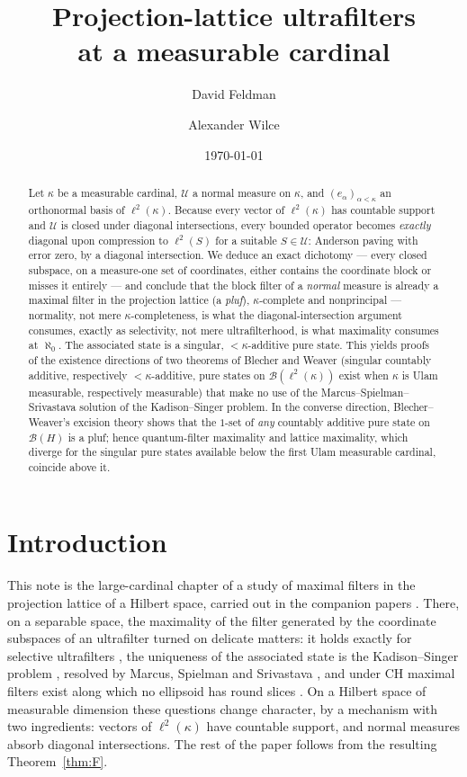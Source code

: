 \documentclass[11pt,reqno]{amsart}
\title[Projection-lattice ultrafilters at a measurable cardinal]
{Projection-lattice ultrafilters\\ at a measurable cardinal}
\author{David Feldman}
\author{Alexander Wilce}
\date{\today}
\theoremstyle{definition}
\newcommand{\U}{\mathcal{U}}
\newcommand{\lk}{\ell^2(\kappa)}
\newcommand{\Blk}{\mathcal{B}(\ell^2(\kappa))}
\begin{document}
\begin{abstract}
Let $\kappa$ be a measurable cardinal, $\U$ a normal measure on $\kappa$, and
$(e_\alpha)_{\alpha<\kappa}$ an orthonormal basis of $\lk$. Because every vector of
$\lk$ has countable support and $\U$ is closed under diagonal intersections, every
bounded operator becomes \emph{exactly} diagonal upon compression to $\ell^2(S)$ for a
suitable $S\in\U$: Anderson paving with error zero, by a diagonal intersection. We
deduce an exact dichotomy --- every closed subspace, on a measure-one set of
coordinates, either contains the coordinate block or misses it entirely --- and
conclude that the block filter of a \emph{normal} measure is already a maximal filter
in the projection lattice (a \emph{pluf}), $\kappa$-complete and nonprincipal ---
normality, not mere $\kappa$-completeness, is what the diagonal-intersection argument
consumes, exactly as selectivity, not mere ultrafilterhood, is what maximality
consumes at $\aleph_0$. The associated state is
a singular, $<\kappa$-additive pure state. This yields proofs of the existence
directions of two theorems of Blecher and Weaver (singular countably additive,
respectively $<\kappa$-additive, pure states on $\Blk$ exist when $\kappa$ is Ulam
measurable, respectively measurable) that make no use of the Marcus--Spielman--Srivastava
solution of the Kadison--Singer problem. In the converse direction, Blecher--Weaver's
excision theory shows that the $1$-set of \emph{any} countably additive pure state on
$\mathcal B(H)$ is a pluf; hence quantum-filter maximality and lattice maximality, which
diverge for the singular pure states available below the first Ulam measurable cardinal,
coincide above it.
\end{abstract}

\maketitle

\section{Introduction}\label{sec:intro}

This note is the large-cardinal chapter of a study of maximal filters in the projection
lattice of a Hilbert space, carried out in the companion papers \cite{FWI,FWII}. There,
on a separable space, the maximality of the filter generated by the coordinate
subspaces of an ultrafilter turned on delicate matters: it holds exactly for selective
ultrafilters \cite{FWII}, the uniqueness of the associated state is the Kadison--Singer
problem \cite{KadisonSinger}, resolved by Marcus, Spielman and Srivastava \cite{MSS},
and under CH maximal filters exist along which no ellipsoid has round slices
\cite{FWI}. On a Hilbert space of measurable dimension these questions change
character, by a mechanism with two ingredients: vectors of $\lk$ have countable
support, and normal measures absorb diagonal intersections. The rest of the paper
follows from the resulting Theorem~\ref{thm:F}.
\end{document}

